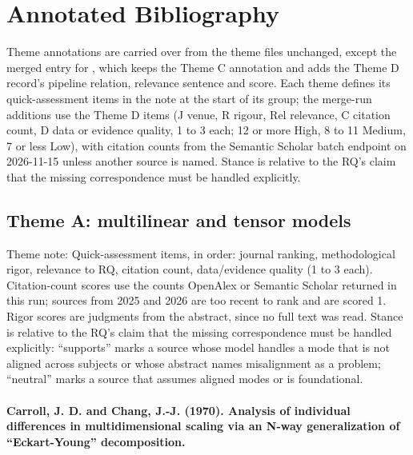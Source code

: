 \documentclass[journal,onecolumn]{IEEEtran}
\begin{document}
\section{Annotated Bibliography}

Theme annotations are carried over from the theme files unchanged, except the merged entry for \cite{Chen2021AMINN}, which keeps the Theme C annotation and adds the Theme D record's pipeline relation, relevance sentence and score. Each theme defines its quick-assessment items in the note at the start of its group; the merge-run additions use the Theme D items (J venue, R rigour, Rel relevance, C citation count, D data or evidence quality, 1 to 3 each; 12 or more High, 8 to 11 Medium, 7 or less Low), with citation counts from the Semantic Scholar batch endpoint on 2026-11-15 unless another source is named. Stance is relative to the RQ's claim that the missing correspondence must be handled explicitly.

\subsection{Theme A: multilinear and tensor models}

Theme note: Quick-assessment items, in order: journal ranking, methodological rigor, relevance to RQ, citation count, data/evidence quality (1 to 3 each). Citation-count scores use the counts OpenAlex or Semantic Scholar returned in this run; sources from 2025 and 2026 are too recent to rank and are scored 1. Rigor scores are judgments from the abstract, since no full text was read. Stance is relative to the RQ's claim that the missing correspondence must be handled explicitly: ``supports'' marks a source whose model handles a mode that is not aligned across subjects or whose abstract names misalignment as a problem; ``neutral'' marks a source that assumes aligned modes or is foundational.

\paragraph{Carroll, J. D. and Chang, J.-J. (1970). Analysis of individual differences in multidimensional scaling via an N-way generalization of ``Eckart-Young'' decomposition.~\cite{Carroll1970Individual}}\mbox{}
\end{document}
